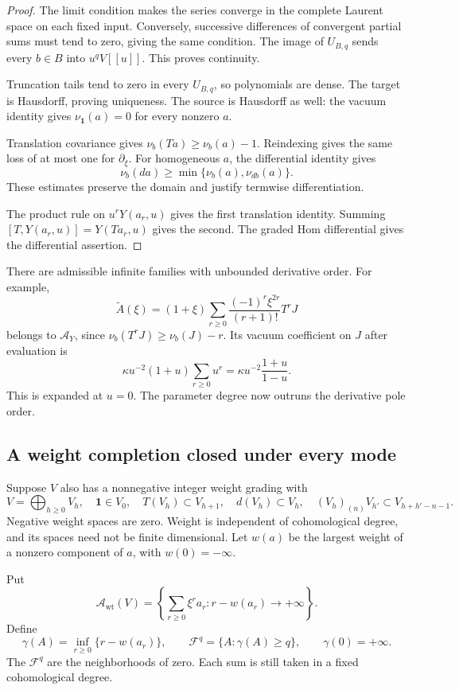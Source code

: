 \begin{proof}
The limit condition makes the series
converge in the complete Laurent space
on each fixed input. Conversely, successive
differences of convergent partial sums
must tend to zero, giving the same condition.
The image of \(U_{B,q}\) sends every
\(b\in B\) into \(u^qV[[u]]\).
This proves continuity.

Truncation tails tend to zero in every
\(U_{B,q}\), so polynomials are dense.
The target is Hausdorff, proving uniqueness.
The source is Hausdorff as well:
the vacuum identity gives \(\nu_{\mathbf1}(a)=0\)
for every nonzero \(a\).

Translation covariance gives
\(\nu_b(Ta)\geq\nu_b(a)-1\).
Reindexing gives the same loss of at most
one for \(\partial_\xi\).
For homogeneous \(a\), the differential identity gives
\[
                 \nu_b(da)\geq\min\{\nu_b(a),\nu_{db}(a)\}.
\]
These estimates preserve the domain and
justify termwise differentiation.

The product rule on \(u^rY(a_r,u)\)
gives the first translation identity.
Summing \([T,Y(a_r,u)]=Y(Ta_r,u)\)
gives the second.
The graded Hom differential gives the
differential assertion.
\end{proof}

There are admissible infinite families
with unbounded derivative order.
For example,
\[
 \widetilde A(\xi)
      =(1+\xi)\sum_{r\geq0}
                \frac{(-1)^r\xi^{2r}}{(r+1)!}T^rJ
\]
belongs to \(\mathscr A_Y\), since
\(\nu_b(T^rJ)\geq\nu_b(J)-r\).
Its vacuum coefficient on \(J\) after evaluation is
\[
               \kappa u^{-2}(1+u)\sum_{r\geq0}u^r
                         =\kappa u^{-2}\frac{1+u}{1-u}.
\]
This is expanded at \(u=0\).
The parameter degree now outruns the
derivative pole order.

\subsection{A weight completion closed under every mode}

Suppose \(V\) also has a nonnegative
integer weight grading with
\[
 V=\bigoplus_{h\geq0}V_h,\quad
 \mathbf1\in V_0,\quad T(V_h)\subset V_{h+1},\quad
 d(V_h)\subset V_h,\quad
 (V_h)_{(n)}V_{h'}\subset V_{h+h'-n-1}.
\]
Negative weight spaces are zero.
Weight is independent of cohomological degree,
and its spaces need not be finite dimensional.
Let \(w(a)\) be the largest weight of a
nonzero component of \(a\), with \(w(0)=-\infty\).

Put
\begin{equation}\label{v4-eq:singular-weight-completion}
 \mathscr A_{\mathrm{wt}}(V)
   =\left\{\sum_{r\geq0}\xi^ra_r:
                r-w(a_r)\longrightarrow+\infty\right\}.
\end{equation}
Define
\[
 \gamma(A)=\inf_{r\geq0}\{r-w(a_r)\},\qquad
 \mathcal F^q=\{A:\gamma(A)\geq q\},\qquad
 \gamma(0)=+\infty.
\]
The \(\mathcal F^q\) are the neighborhoods
of zero. Each sum is still taken in
a fixed cohomological degree.

